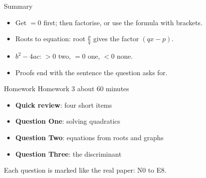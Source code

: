 \documentclass[aspectratio=169,11pt,xcolor=table,t]{beamer}
\newcommand\hp[1]{\fref{Handout p.\pageref{H-#1}}}
\begin{document}
\begin{frame}{Summary}
\relax
\begin{itemize}
\item Get $= 0$ first; then factorise, or use the formula with brackets.
\item Roots to equation: root $\frac{p}{q}$ gives the factor $(qx - p)$.
\item $b^{2} - 4ac$: $>0$ two, $=0$ one, $<0$ none.
\item Proofs end with the sentence the question asks for.
\end{itemize}
\hp{h3:solve}
\end{frame}

\begin{frame}{Homework}
\relax
Homework 3 \textperiodcentered{} about 60 minutes
\begin{itemize}
\item \textbf{Quick review}: four short items
\item \textbf{Question One}: solving quadratics
\item \textbf{Question Two}: equations from roots and graphs
\item \textbf{Question Three}: the discriminant
\end{itemize}
Each question is marked like the real paper: N0 to E8.
\end{frame}
\end{document}
